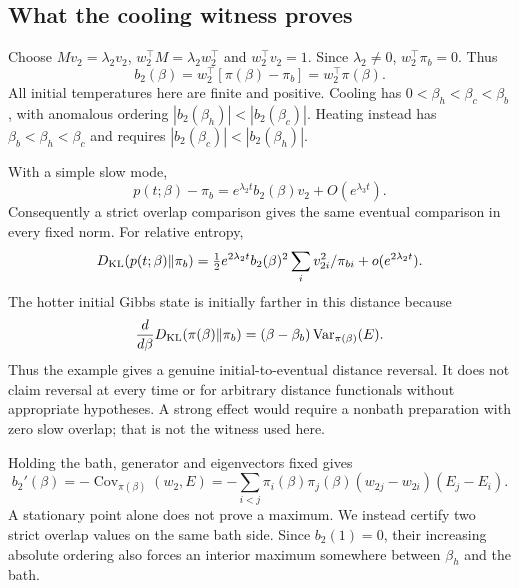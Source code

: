 \documentclass[11pt]{article}
\newcommand{\Cov}{\operatorname{Cov}}
\newcommand{\Var}{\operatorname{Var}}
\begin{document}
\subsection{What the cooling witness proves}
Choose $Mv_2=\lambda_2v_2$, $w_2^\top M=\lambda_2w_2^\top$ and $w_2^\top v_2=1$. Since $\lambda_2\ne0$, $w_2^\top\pi_b=0$. Thus
\[
b_2(\beta)=w_2^\top[\pi(\beta)-\pi_b]=w_2^\top\pi(\beta).
\]
All initial temperatures here are finite and positive. Cooling has $0<\beta_h<\beta_c<\beta_b$, with anomalous ordering $|b_2(\beta_h)|<|b_2(\beta_c)|$. Heating instead has $\beta_b<\beta_h<\beta_c$ and requires $|b_2(\beta_c)|<|b_2(\beta_h)|$.

With a simple slow mode,
\[
p(t;\beta)-\pi_b=e^{\lambda_2t}b_2(\beta)v_2+O(e^{\lambda_3t}).
\]
Consequently a strict overlap comparison gives the same eventual comparison in every fixed norm. For relative entropy,
\[
D_{\rm KL}(p(t;\beta)\Vert\pi_b)=\tfrac12e^{2\lambda_2t}b_2(\beta)^2
\sum_i v_{2i}^2/\pi_{bi}+o(e^{2\lambda_2t}).
\]
The hotter initial Gibbs state is initially farther in this distance because
\[
\frac{d}{d\beta}D_{\rm KL}(\pi(\beta)\Vert\pi_b)
=(\beta-\beta_b)\Var_{\pi(\beta)}(E).
\]
Thus the example gives a genuine initial-to-eventual distance reversal. It does not claim reversal at every time or for arbitrary distance functionals without appropriate hypotheses. A strong effect would require a nonbath preparation with zero slow overlap; that is not the witness used here.

Holding the bath, generator and eigenvectors fixed gives
\[
b_2'(\beta)=-\Cov_{\pi(\beta)}(w_2,E)
=-\sum_{i<j}\pi_i(\beta)\pi_j(\beta)(w_{2j}-w_{2i})(E_j-E_i).
\]
A stationary point alone does not prove a maximum. We instead certify two strict overlap values on the same bath side. Since $b_2(1)=0$, their increasing absolute ordering also forces an interior maximum somewhere between $\beta_h$ and the bath.
\end{document}
